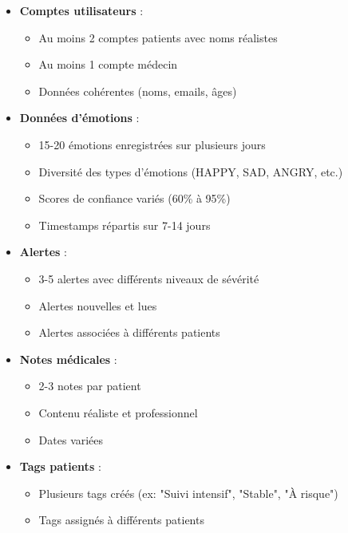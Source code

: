 \documentclass[a4paper,11pt]{report}
\begin{document}
\begin{itemize}
    \item \textbf{Comptes utilisateurs} :
    \begin{itemize}
        \item Au moins 2 comptes patients avec noms réalistes
        \item Au moins 1 compte médecin
        \item Données cohérentes (noms, emails, âges)
    \end{itemize}
    
    \item \textbf{Données d'émotions} :
    \begin{itemize}
        \item 15-20 émotions enregistrées sur plusieurs jours
        \item Diversité des types d'émotions (HAPPY, SAD, ANGRY, etc.)
        \item Scores de confiance variés (60\% à 95\%)
        \item Timestamps répartis sur 7-14 jours
    \end{itemize}
    
    \item \textbf{Alertes} :
    \begin{itemize}
        \item 3-5 alertes avec différents niveaux de sévérité
        \item Alertes nouvelles et lues
        \item Alertes associées à différents patients
    \end{itemize}
    
    \item \textbf{Notes médicales} :
    \begin{itemize}
        \item 2-3 notes par patient
        \item Contenu réaliste et professionnel
        \item Dates variées
    \end{itemize}
    
    \item \textbf{Tags patients} :
    \begin{itemize}
        \item Plusieurs tags créés (ex: "Suivi intensif", "Stable", "À risque")
        \item Tags assignés à différents patients
    \end{itemize}
\end{itemize}
\end{document}
